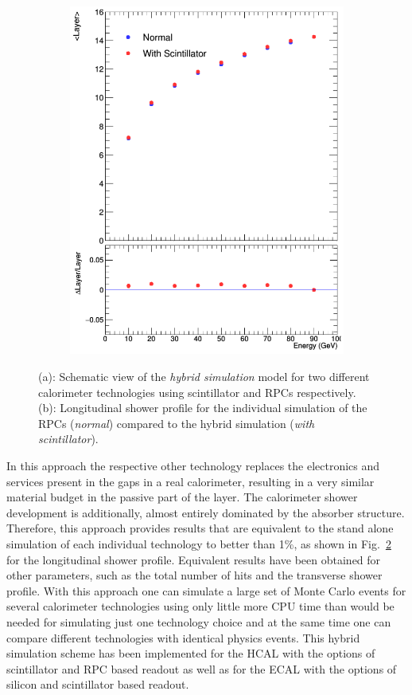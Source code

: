 \begin{figure}[b!]
\begin{subfigure}{0.49\hsize}
    \includegraphics[width=\textwidth]{Modelling/fig/SDHcal_hybrid_normal_comparison.png}
    \caption{ \label{fig:sim_hybrid_longitudenal_profile}}
  \end{subfigure}
  \caption{(a): Schematic view of the \emph{hybrid simulation} model for two different
    calorimeter technologies using scintillator and RPCs respectively.
    (b): Longitudinal shower profile for the individual simulation of the RPCs (\emph{normal}) compared to
    the hybrid simulation (\emph{with scintillator}).}
\end{figure}
%
In this approach the respective other technology replaces the electronics and services present in the gaps in a
real calorimeter, resulting in a very similar material budget in the passive part of the layer.
The calorimeter shower development is additionally, almost entirely dominated by the absorber structure. Therefore,
this approach provides results that are equivalent to the stand alone simulation of each individual technology to
better than 1\%, as shown in Fig.~\ref{fig:sim_hybrid_longitudenal_profile} for the longitudinal shower profile. Equivalent results have
been obtained for other parameters, such as the total number of hits and the transverse shower profile.
With this approach one can simulate a large set of Monte Carlo events for
several calorimeter technologies using only little more CPU time than would be needed for simulating just one
technology choice and at the same time one can compare different technologies with identical physics events.
This hybrid simulation scheme has been implemented for the HCAL with the options of scintillator and RPC based readout as well as for
the ECAL with the options of silicon and scintillator based readout.

